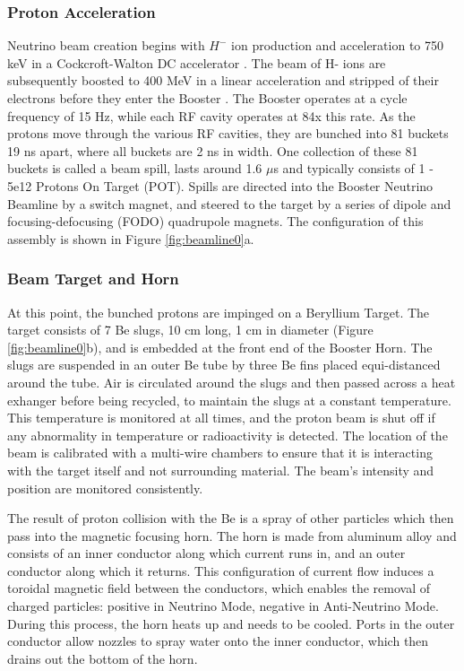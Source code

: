 \documentclass[12pt]{article}
\begin{document}
\subsubsection{Proton Acceleration}
Neutrino beam creation begins with $H^-$ ion production and acceleration to 750 keV in a Cockcroft-Walton DC accelerator \cite{anderson}. The beam of H- ions are subsequently boosted to 400 MeV in a linear acceleration and stripped of their electrons before they enter the Booster \cite{bib:bnbflux}.  The Booster operates at a cycle frequency of 15 Hz, while each RF cavity operates at 84x this rate. As the protons move through the various RF cavities, they are bunched into 81 buckets 19 ns apart, where all buckets are 2 ns in width.  One collection of these 81 buckets is called a beam spill, lasts around 1.6 $\mu$s and typically consists of 1 - 5e12 Protons On Target (POT). Spills are directed into the Booster Neutrino Beamline by a switch magnet, and steered to the target by a series of dipole and focusing-defocusing (FODO) quadrupole magnets.  The configuration of this assembly is shown in Figure \ref{fig:beamline0}a. 
\subsubsection{Beam Target and Horn}
\par At this point, the bunched protons are impinged on a Beryllium Target. The target consists of 7 Be slugs, 10 cm long, 1 cm in diameter (Figure \ref{fig:beamline0}b), and is embedded at the front end of the Booster Horn. The slugs are suspended in an outer Be tube by three Be fins placed equi-distanced around the tube.  Air is circulated around the slugs and then passed across a heat exhanger before being recycled, to maintain the slugs at a constant temperature. This temperature is monitored at all times, and the proton beam is shut off if any abnormality in temperature or radioactivity is detected. The location of the beam is calibrated with a multi-wire chambers to ensure that it is interacting with the target itself and not surrounding material. The beam's intensity and position are monitored consistently.
\par The result of proton collision with the Be is a spray of other particles which then pass into the magnetic focusing horn. The horn is made from aluminum alloy and consists of an inner conductor along which current runs in, and an outer conductor along which it returns. This configuration of current flow induces a toroidal magnetic field between the conductors, which enables the removal of charged particles: positive in Neutrino Mode, negative in Anti-Neutrino Mode. During this process, the horn heats up and needs to be cooled.  Ports in the outer conductor allow nozzles to spray water onto the inner conductor, which then drains out the bottom of the horn.
\end{document}
